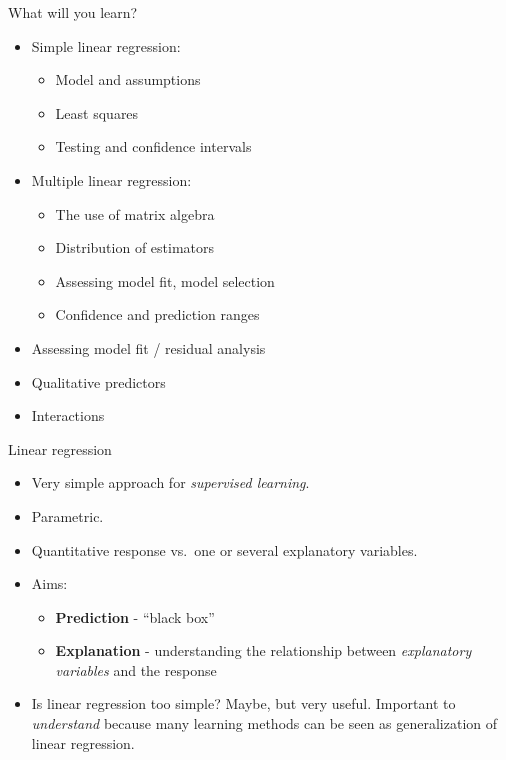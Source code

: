 \documentclass[10pt,ignorenonframetext,]{beamer}
\providecommand{\tightlist}{%
  \setlength{\itemsep}{0pt}\setlength{\parskip}{0pt}}
\begin{document}
\begin{frame}

\begin{block}{What will you learn?}

\begin{itemize}
\tightlist
\item
  Simple linear regression:

  \begin{itemize}
  \tightlist
  \item
    Model and assumptions
  \item
    Least squares
  \item
    Testing and confidence intervals
  \end{itemize}
\item
  Multiple linear regression:

  \begin{itemize}
  \tightlist
  \item
    The use of matrix algebra
  \item
    Distribution of estimators
  \item
    Assessing model fit, model selection
  \item
    Confidence and prediction ranges
  \end{itemize}
\item
  Assessing model fit / residual analysis
\item
  Qualitative predictors
\item
  Interactions
\end{itemize}

\end{block}

\end{frame}

\begin{frame}{Linear regression}

\begin{itemize}
\item
  Very simple approach for \emph{supervised learning}.
\item
  Parametric.
\item
  Quantitative response vs.~one or several explanatory variables.
\item
  Aims:

  \begin{itemize}
  \tightlist
  \item
    \textbf{Prediction} - ``black box''
  \item
    \textbf{Explanation} - understanding the relationship between
    \emph{explanatory variables} and the response
  \end{itemize}
\item
  Is linear regression too simple? Maybe, but very useful. Important to
  \emph{understand} because many learning methods can be seen as
  generalization of linear regression.
\end{itemize}

\end{frame}
\end{document}
